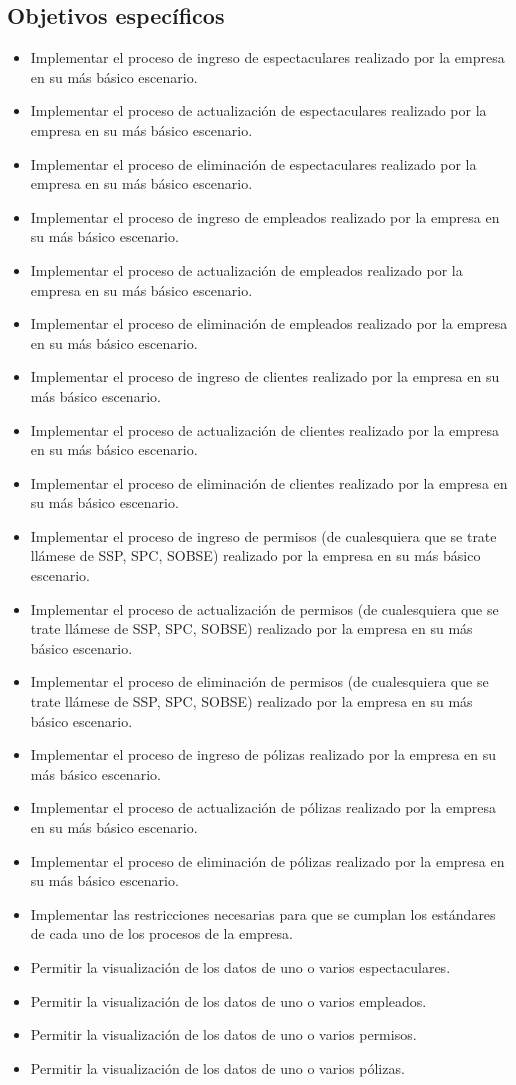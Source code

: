 \subsection{Objetivos específicos}
\begin{itemize}
\item{Implementar el proceso de ingreso de espectaculares realizado por la empresa en su más básico escenario.}
\item{Implementar el proceso de actualización de espectaculares realizado por la empresa en su más básico escenario.}
\item{Implementar el proceso de eliminación de espectaculares realizado por la empresa en su más básico escenario.}
\item{Implementar el proceso de ingreso de empleados realizado por la empresa en su más básico escenario.}
\item{Implementar el proceso de actualización de empleados realizado por la empresa en su más básico escenario.}
\item{Implementar el proceso de eliminación de empleados realizado por la empresa en su más básico escenario.}
\item{Implementar el proceso de ingreso de clientes realizado por la empresa en su más básico escenario.}
\item{Implementar el proceso de actualización de clientes realizado por la empresa en su más básico escenario.}
\item{Implementar el proceso de eliminación de clientes realizado por la empresa en su más básico escenario.}
\item{Implementar el proceso de ingreso de permisos (de cualesquiera que se trate llámese de SSP, SPC, SOBSE) realizado por la empresa en su más básico escenario.}
\item{Implementar el proceso de actualización de permisos (de cualesquiera que se trate llámese de SSP, SPC, SOBSE) realizado por la empresa en su más básico escenario.}
\item{Implementar el proceso de eliminación de permisos (de cualesquiera que se trate llámese de SSP, SPC, SOBSE) realizado por la empresa en su más básico escenario.}
\item{Implementar el proceso de ingreso de pólizas realizado por la empresa en su más básico escenario.}
\item{Implementar el proceso de actualización de pólizas realizado por la empresa en su más básico escenario.}
\item{Implementar el proceso de eliminación de pólizas realizado por la empresa en su más básico escenario.}
\item{Implementar las restricciones necesarias para que se cumplan los estándares de cada uno de los procesos de la empresa.}
\item{Permitir la visualización de los datos de uno o varios espectaculares.}
\item{Permitir la visualización de los datos de uno o varios empleados.}
\item{Permitir la visualización de los datos de uno o varios permisos.}
\item{Permitir la visualización de los datos de uno o varios pólizas.}
\end{itemize}
